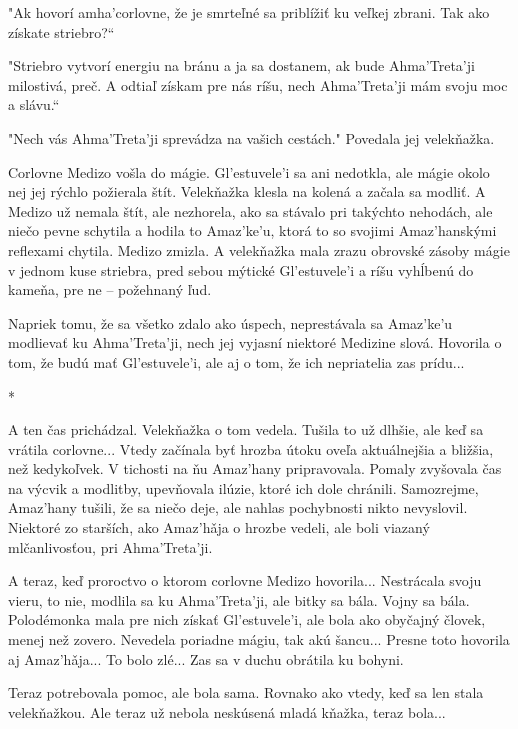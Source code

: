 \documentclass{book}
\begin{document}
"$ $Ak hovorí amha'corlovne, že je smrteľné sa priblížiť ku veľkej zbrani. Tak ako získate striebro?“

"$ $Striebro vytvorí energiu na bránu a ja sa dostanem, ak bude Ahma'Treta'ji milostivá, preč. A odtiaľ získam pre nás ríšu, nech Ahma'Treta'ji mám svoju moc a slávu.“

"$ $Nech vás Ahma'Treta'ji sprevádza na vašich cestách."$ $ Povedala jej velekňažka.

Corlovne Medizo vošla do mágie. Gl'estuvele'i sa ani nedotkla, ale mágie okolo nej jej rýchlo požierala štít. Velekňažka klesla na kolená a začala sa modliť. A Medizo už nemala štít, ale nezhorela, ako sa stávalo pri takýchto nehodách, ale niečo pevne schytila a hodila to Amaz'ke'u, ktorá to so svojimi Amaz'hanskými reflexami chytila. Medizo zmizla. A velekňažka mala zrazu obrovské zásoby mágie v jednom kuse striebra, pred sebou mýtické Gl'estuvele'i a ríšu vyhĺbenú do kameňa, pre ne – požehnaný ľud.

Napriek tomu, že sa všetko zdalo ako úspech, neprestávala sa Amaz'ke'u modlievať ku Ahma'Treta'ji, nech jej vyjasní niektoré Medizine slová. Hovorila o tom, že budú mať Gl'estuvele'i, ale aj o tom, že ich nepriatelia zas prídu...

\begin{center}
*
\end{center}

A ten čas prichádzal. Velekňažka o tom vedela. Tušila to už dlhšie, ale keď sa vrátila corlovne... Vtedy začínala byť hrozba útoku oveľa aktuálnejšia a bližšia, než kedykoľvek. V tichosti na ňu Amaz'hany pripravovala. Pomaly zvyšovala čas na výcvik a modlitby, upevňovala ilúzie, ktoré ich dole chránili. Samozrejme, Amaz'hany tušili, že sa niečo deje, ale nahlas pochybnosti nikto nevyslovil. Niektoré zo starších, ako Amaz'ha\v{}ja o hrozbe vedeli, ale boli viazaný mlčanlivosťou, pri Ahma'Treta'ji.

A teraz, keď proroctvo o ktorom corlovne Medizo hovorila... Nestrácala svoju vieru, to nie, modlila sa ku Ahma'Treta'ji, ale bitky sa bála. Vojny sa bála. Polodémonka mala pre nich získať Gl'estuvele'i, ale bola ako obyčajný človek, menej než zovero. Nevedela poriadne mágiu, tak akú šancu... Presne toto hovorila aj Amaz'ha\v{}ja... To bolo zlé... Zas sa v duchu obrátila ku bohyni.

Teraz potrebovala pomoc, ale bola sama. Rovnako ako vtedy, keď sa len stala velekňažkou. Ale teraz už nebola neskúsená mladá kňažka, teraz bola...
\end{document}
